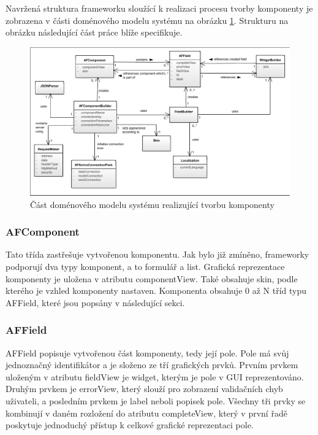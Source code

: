 Navržená struktura frameworku sloužící k realizaci procesu tvorby komponenty je zobrazena v části doménového modelu systému na obrázku \ref{img:domainModelBuild}. Strukturu na obrázku následující část práce blíže specifikuje.

\begin{figure}[h!]
\includegraphics[width=\textwidth, trim=1 1 1 1, clip]{figures/domainModelBuild}
\caption{Část doménového modelu systému realizující tvorbu komponenty}
\label{img:domainModelBuild}
\end{figure}

\subsubsection{AFComponent}
Tato třída zastřešuje vytvořenou komponentu. Jak bylo již zmíněno, frameworky podporují dva typy komponent, a to formulář a list. Grafická reprezentace komponenty je uložena v atributu componentView. Také obsahuje skin, podle kterého je vzhled komponenty nastaven. Komponenta obsahuje 0 až N tříd typu AFField, které jsou popsány v následující sekci.

\subsubsection{AFField}
AFField popisuje vytvořenou část komponenty, tedy její pole. Pole má svůj jednoznačný identifikátor a je složeno ze tří grafických prvků. Prvním prvkem uloženým v atributu fieldView je widget, kterým je pole v GUI reprezentováno. Druhým prvkem je errorView, který slouží pro zobrazení validačních chyb uživateli, a posledním prvkem je label neboli popisek pole. Všechny tři prvky se kombinují v daném rozložení do atributu completeView, který v první řadě poskytuje jednoduchý přístup k celkové grafické reprezentaci pole.

